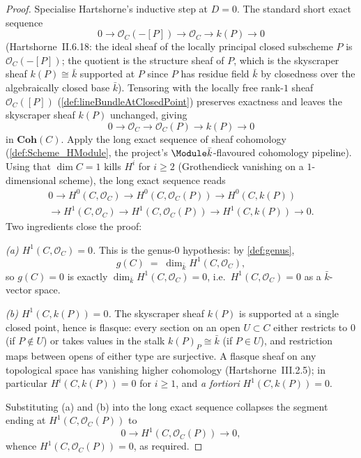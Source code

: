 \begin{proof}
  
  Specialise Hartshorne's inductive step at \(D = 0\). The standard short
  exact sequence
  \[
    0 \to \mathcal O_C(-[P]) \to \mathcal O_C \to k(P) \to 0
  \]
  (Hartshorne~II.6.18: the ideal sheaf of the locally principal closed
  subscheme \(P\) is \(\mathcal O_C(-[P])\); the quotient is the structure
  sheaf of \(P\), which is the skyscraper sheaf \(k(P) \cong \bar k\)
  supported at \(P\) since \(P\) has residue field \(\bar k\) by closedness
  over the algebraically closed base \(\bar k\)). Tensoring with the
  locally free rank-\(1\) sheaf \(\mathcal O_C([P])\)
  (\cref{def:lineBundleAtClosedPoint}) preserves exactness and leaves
  the skyscraper sheaf \(k(P)\) unchanged, giving
  \[
    0 \to \mathcal O_C \to \mathcal O_C(P) \to k(P) \to 0
  \]
  in \(\mathbf{Coh}(C)\). Apply the long exact sequence of sheaf
  cohomology (\cref{def:Scheme_HModule}, the project's $\Module \bar
  k$-flavoured cohomology pipeline). Using that $\dim C = 1$ kills
  \(H^i\) for \(i \geq 2\) (Grothendieck vanishing on a \(1\)-dimensional
  scheme), the long exact sequence reads
  \begin{multline*}
    0 \to H^0(C, \mathcal O_C) \to H^0(C, \mathcal O_C(P)) \to H^0(C, k(P)) \\
    \to H^1(C, \mathcal O_C) \to H^1(C, \mathcal O_C(P)) \to H^1(C, k(P)) \to 0.
  \end{multline*}
  Two ingredients close the proof:

  \emph{(a) \(H^1(C, \mathcal O_C) = 0\).} This is the genus-\(0\)
  hypothesis: by \cref{def:genus},
  \[
    g(C) \;=\; \dim_{\bar k} H^1(C, \mathcal O_C),
  \]
  so \(g(C) = 0\) is exactly \(\dim_{\bar k} H^1(C, \mathcal O_C) = 0\),
  i.e.\ \(H^1(C, \mathcal O_C) = 0\) as a \(\bar k\)-vector space.

  \emph{(b) \(H^1(C, k(P)) = 0\).} The skyscraper sheaf \(k(P)\) is
  supported at a single closed point, hence is flasque: every section
  on an open \(U \subset C\) either restricts to \(0\) (if \(P \notin U\)) or
  takes values in the stalk \(k(P)_P \cong \bar k\) (if \(P \in U\)), and
  restriction maps between opens of either type are surjective. A
  flasque sheaf on any topological space has vanishing higher
  cohomology (Hartshorne~III.2.5); in particular
  \(H^i(C, k(P)) = 0\) for \(i \geq 1\), and \emph{a fortiori}
  \(H^1(C, k(P)) = 0\).

  Substituting (a) and (b) into the long exact sequence collapses the
  segment ending at \(H^1(C, \mathcal O_C(P))\) to
  \[
    0 \to H^1(C, \mathcal O_C(P)) \to 0,
  \]
  whence \(H^1(C, \mathcal O_C(P)) = 0\), as required.


\end{proof}
